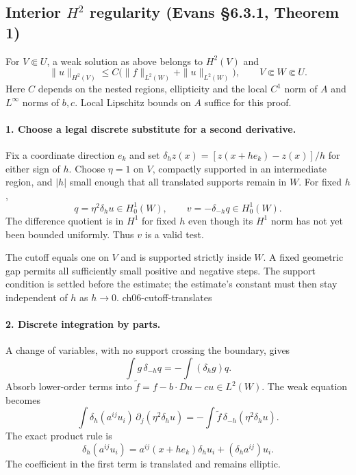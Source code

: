 \subsection{Interior $H^2$ regularity (Evans \S6.3.1, Theorem 1)}
\begin{theorem}\label{thm:6-interior-h2}
For $V\Subset U$, a weak solution as above belongs to $H^2(V)$ and
\[
 \|u\|_{H^2(V)}
 \leq C\bigl(\|f\|_{L^2(W)}+\|u\|_{L^2(W)}\bigr),
 \qquad V\Subset W\Subset U.
\]
Here $C$ depends on the nested regions, ellipticity and the local
$C^1$ norm of $A$ and $L^\infty$ norms of $b,c$.
Local Lipschitz bounds on $A$ suffice for this proof.
\end{theorem}
\begin{expandedproof}
\paragraph{1. Choose a legal discrete substitute for a second derivative.}
Fix a coordinate direction $e_k$ and set
$\delta_h z(x)=[z(x+he_k)-z(x)]/h$ for either sign of $h$.
Choose $\eta=1$ on $V$, compactly supported in an intermediate region,
and $|h|$ small enough that all translated supports remain in $W$.
For fixed $h$,
\[
 q=\eta^2\delta_h u\in H^1_0(W),\qquad
 v=-\delta_{-h}q\in H^1_0(W).
\]
The difference quotient is in $H^1$ for fixed $h$ even though its
$H^1$ norm has not yet been bounded uniformly. Thus $v$ is a valid test.

\Needspace{45mm}

{The cutoff equals one on $V$ and is supported strictly inside $W$. A fixed geometric gap permits all sufficiently small positive and negative steps. The support condition is settled before the estimate; the estimate's constant must then stay independent of $h$ as $h\to0$.}
{ch06-cutoff-translates}

\paragraph{2. Discrete integration by parts.}
A change of variables, with no support crossing the boundary, gives
\[
 \int g\,\delta_{-h}q=-\int(\delta_h g)q.
\]
Absorb lower-order terms into
$\widetilde f=f-b\cdot Du-cu\in L^2(W)$. The weak equation becomes
\[
 \int\delta_h(a^{ij}u_i)\,\partial_j(\eta^2\delta_hu)
       =-\int\widetilde f\,\delta_{-h}(\eta^2\delta_hu).
\]
The exact product rule is
\[
 \delta_h(a^{ij}u_i)
 =a^{ij}(x+he_k)\delta_hu_i+(\delta_h a^{ij})u_i .
\]
The coefficient in the first term is translated and remains elliptic.


\end{expandedproof}
